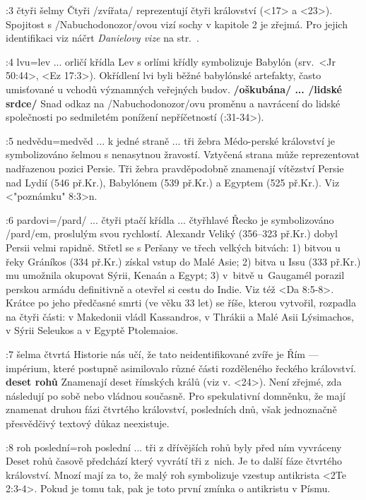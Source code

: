 :3 {čtyři šelmy}
    Čtyři \x/zvířata/ reprezentují čtyři království (<17> a <23>).
    Spojitost  s \x/Nabuchodonozor/ovou vizí sochy v kapitole 2 je zřejmá. Pro jejich identifikaci viz náčrt      {\it Danielovy vize\/} na str.~\pgref[danielovavize]. 

:4 {lvu}={lev ... orličí křídla} 
     Lev s orlími křídly symbolizuje Babylón (srv.~<Jr 50:44>, <Ez 17:3>).
     Okřídlení lvi byli běžné babylónské artefakty, často umisťované u vchodů významných veřejných budov.      {\bf \x/oškubána/ ... \x/lidské srdce/} Snad odkaz na \x/Nabuchodonozor/ovu
     proměnu a navrácení do lidské společnosti po sedmiletém ponížení nepříčetností
     (:31-34>).

:5 {nedvědu}={medvěd ... k jedné straně ... tři žebra} 
     Médo-perské království je symbolizováno šelmou s nenasytnou žravostí. Vztyčená
     strana může reprezentovat nadřazenou pozici Persie. Tři žebra pravděpodobně znamenají
     vítězství Persie nad Lydií (546 př.Kr.), Babylónem (539 př.Kr.) a Egyptem (525 př.Kr.).
     Viz <"poznámku" 8:3>n.

:6 {pardovi}={\x/pard/ ... čtyři ptačí křídla ... čtyřhlavé}
     Řecko je symbolizováno \x/pard/em, proslulým svou rychlostí.
     Alexandr Veliký (356--323 př.Kr.) dobyl Persii velmi rapidně.
     Střetl se s Peršany ve třech velkých bitvách:
     1) bitvou u řeky Gráníkos (334 př.Kr.) získal vstup do Malé Asie; 
     2) bitva u Issu (333 př.Kr.) mu umožnila okupovat Sýrii, Kenaán a Egypt; 
     3) v~bitvě u~Gaugamél porazil perskou armádu definitivně a otevřel si cestu do Indie.
        Viz též <Da 8:5-8>. Krátce po jeho předčasné smrti (ve věku 33 let) se říše, kterou
        vytvořil, rozpadla na čtyři části: v Makedonii vládl Kassandros, v Thrákii a Malé Asii
        Lýsimachos, v Sýrii Seleukos a v Egyptě Ptolemaios.

:7 {šelma čtvrtá}
     Historie nás učí, že tato neidentifikované zvíře je Řím --- impérium, které postupně
     asimilovalo různé části rozděleného řeckého království. 
     {\bf deset rohů} Znamenají deset římských králů (viz v. <24>). Není zřejmé, zda následují po      sobě nebo vládnou současně. Pro spekulativní domněnku, že mají znamenat druhou fázi čtvrtého    království,  posledních dnů, však jednoznačně přesvědčivý textový      důkaz neexistuje. 

:8 {roh poslední}={roh poslední ... tři z dřívějších rohů byly před ním vyvráceny}
     Deset rohů časově předchází  který vyvrátí tři z~nich. Je to další fáze
     čtvrtého království. Mnozí mají za to, že malý roh symbolizuje vzestup antikrista 
     <2Te 2:3-4>. Pokud je tomu tak, pak je toto první zmínka o antikristu v Písmu.  

